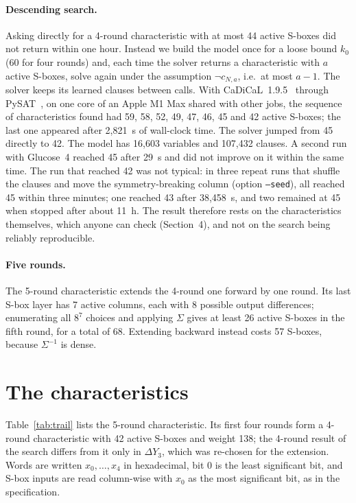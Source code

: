 \documentclass[11pt,a4paper]{article}
\begin{document}
\paragraph{Descending search.} Asking directly for a 4-round characteristic with at most 44
active S-boxes did not return within one hour. Instead we build the model once for a loose bound
$k_0$ (60 for four rounds) and, each time the solver returns a characteristic with $a$ active
S-boxes, solve again under the assumption $\neg c_{N,a}$, i.e.\ at most $a-1$. The solver keeps
its learned clauses between calls. With CaDiCaL~1.9.5~\cite{CaDiCaL} through PySAT~\cite{PySAT},
on one core of an Apple M1 Max shared with other jobs, the sequence of characteristics found had
59, 58, 52, 49, 47, 46, 45 and 42 active S-boxes; the last one appeared after 2{,}821~s of wall-clock
time. The solver jumped from 45 directly to 42. The model has 16{,}603 variables and 107{,}432
clauses. A second run with Glucose~4 reached 45 after 29~s and did not improve on it within the
same time. The run that reached 42 was not typical: in three repeat runs that shuffle the clauses and move the
symmetry-breaking column (option \texttt{--seed}), all reached 45 within three minutes; one reached 43 after 38{,}458~s, and two
remained at 45 when stopped after about 11~h. The result therefore rests on the characteristics
themselves, which anyone can check (Section~4), and not on the search being reliably reproducible.

\paragraph{Five rounds.} The 5-round characteristic extends the 4-round one forward by one round.
Its last S-box layer has 7 active columns, each with 8 possible output differences; enumerating
all $8^7$ choices and applying $\Sigma$ gives at least 26 active S-boxes in the fifth round, for a
total of 68. Extending backward instead costs 57 S-boxes, because $\Sigma^{-1}$ is dense.

\section{The characteristics}

Table~\ref{tab:trail} lists the 5-round characteristic. Its first four rounds form a 4-round
characteristic with 42 active S-boxes and weight 138; the 4-round result of the search differs from it only in $\Delta Y_3$, which was re-chosen for the extension. Words are written $x_0,\dots,x_4$ in hexadecimal, bit 0 is
the least significant bit, and S-box inputs are read column-wise with $x_0$ as the most
significant bit, as in the specification.
\end{document}
